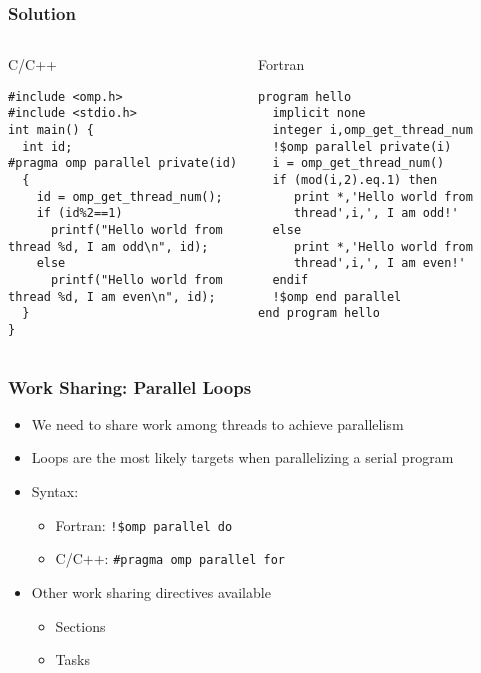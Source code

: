 \documentclass[slidestop,mathserif,compress,xcolor=svgnames]{beamer}
\newenvironment{eblock}[0]
{
\begin{beamerboxesrounded}[upper=uppercol2,lower=lowercol2,shadow=true]}
{\end{beamerboxesrounded}}
\begin{document}
\begin{frame}[fragile]
  \frametitle{\small Solution}
  \begin{columns}
    \column{5cm}
    \begin{eblock}{C/C++}
      {\tiny
      \begin{verbatim}
#include <omp.h>
#include <stdio.h>
int main() {
  int id;
#pragma omp parallel private(id)
  {
    id = omp_get_thread_num();
    if (id%2==1)
      printf("Hello world from 
thread %d, I am odd\n", id);
    else
      printf("Hello world from 
thread %d, I am even\n", id);
  }
}
      \end{verbatim}
      }
    \end{eblock}
    \column{5cm}
    \begin{eblock}{Fortran}
      {\tiny
      \begin{verbatim}
program hello
  implicit none
  integer i,omp_get_thread_num
  !$omp parallel private(i)
  i = omp_get_thread_num()
  if (mod(i,2).eq.1) then
     print *,'Hello world from 
     thread',i,', I am odd!'
  else
     print *,'Hello world from 
     thread',i,', I am even!'
  endif
  !$omp end parallel
end program hello
      \end{verbatim}
      }
    \end{eblock}
  \end{columns}
\end{frame}

\begin{frame}
  \frametitle{\small Work Sharing: Parallel Loops}
  \begin{itemize}
    \item We need to share work among threads to achieve parallelism
    \item Loops are the most likely targets when parallelizing a serial program
    \item Syntax:
    \begin{itemize}
      \item Fortran: \texttt{!\$omp parallel do}
      \item C/C++: \texttt{\#pragma omp parallel for}
    \end{itemize}
    \item Other work sharing directives available
    \begin{itemize}
      \item Sections
      \item Tasks
    \end{itemize}
  \end{itemize}
\end{frame}
\end{document}
